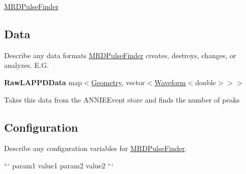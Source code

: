 \hyperlink{classMRDPulseFinder}{M\-R\-D\-Pulse\-Finder}

\subsection*{Data}

Describe any data formats \hyperlink{classMRDPulseFinder}{M\-R\-D\-Pulse\-Finder} creates, destroys, changes, or analyzes. E.\-G.

{\bfseries Raw\-L\-A\-P\-P\-D\-Data} {\ttfamily map$<$\hyperlink{classGeometry}{Geometry}, vector$<$\hyperlink{classWaveform}{Waveform}$<$double$>$$>$$>$}
\begin{DoxyItemize}
\item Takes this data from the {\ttfamily A\-N\-N\-I\-E\-Event} store and finds the number of peaks
\end{DoxyItemize}

\subsection*{Configuration}

Describe any configuration variables for \hyperlink{classMRDPulseFinder}{M\-R\-D\-Pulse\-Finder}.

``` param1 value1 param2 value2 ``` 